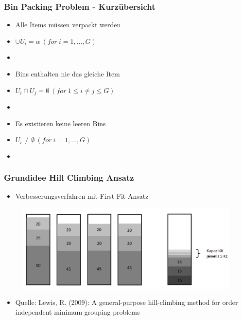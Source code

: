 \documentclass{beamer}
\begin{document}
\begin{frame}
\frametitle{Bin Packing Problem - Kurzübersicht}
\begin{footnotesize}
\begin{itemize}
\item Alle Items müssen verpackt werden
\item[] $\cup U_i = \alpha \ (for \ i = 1,...,G)$
\item[]
\item Bins enthalten nie das gleiche Item
\item[] $U_i \cap U_j = \emptyset \ (for \ 1 \leq i\neq j \leq G )$
\item[]
\item Es existieren keine leeren Bins
\item[] $U_i\neq \emptyset \ (for \ i=1,...,G)$
\item[]
\end{itemize}
\end{footnotesize}
\end{frame}
\begin{frame}
\frametitle{Grundidee Hill Climbing Ansatz}
\begin{footnotesize}
\begin{itemize}
\item Verbesserungsverfahren mit First-Fit Ansatz
\end{itemize}
\end{footnotesize}
\begin{figure}[!htbp]
\begin{center}
\includegraphics[scale=0.25]{img/HC_idee.png}
\end{center}
\end{figure}

\begin{footnotesize}
\begin{itemize}
\item Quelle: Lewis, R. (2009): A general-purpose hill-climbing method for order independent minimum grouping problems
\end{itemize}
\end{footnotesize}
\end{frame}
\end{document}
